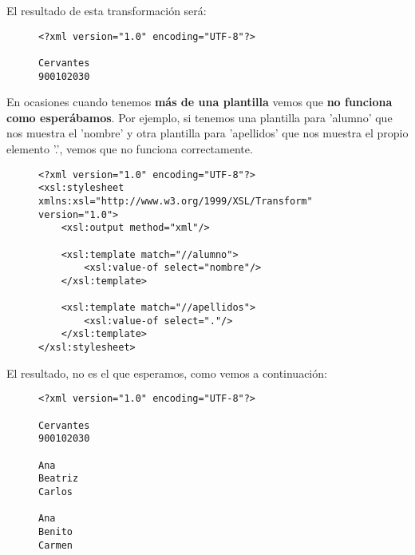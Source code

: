 El resultado de esta transformación será:

\begin{figure}[H]
    \begin{tcolorbox}[sharp corners, colback=yellow!30, colframe=white!20]
        \scriptsize
\begin{verbatim}
<?xml version="1.0" encoding="UTF-8"?>

Cervantes
900102030
\end{verbatim}
    \end{tcolorbox}
\end{figure}

En ocasiones cuando tenemos \textbf{más de una plantilla} vemos que \textbf{no funciona como esperábamos}. Por ejemplo, si tenemos una plantilla para 'alumno' que nos muestra el 'nombre' y otra plantilla para 'apellidos' que nos muestra el propio elemento '.', vemos que no funciona correctamente.

\begin{figure}[H]
    \begin{tcolorbox}[sharp corners, colback=yellow!30, colframe=white!20]
        \scriptsize
\begin{verbatim}
<?xml version="1.0" encoding="UTF-8"?>
<xsl:stylesheet xmlns:xsl="http://www.w3.org/1999/XSL/Transform" version="1.0">
    <xsl:output method="xml"/>

    <xsl:template match="//alumno">
        <xsl:value-of select="nombre"/>
    </xsl:template>

    <xsl:template match="//apellidos">
        <xsl:value-of select="."/>
    </xsl:template>
</xsl:stylesheet>
\end{verbatim}
    \end{tcolorbox}
\end{figure}

El resultado, no es el que esperamos, como vemos a continuación:

\begin{figure}[H]
    \begin{tcolorbox}[sharp corners, colback=yellow!30, colframe=white!20]
        \scriptsize
\begin{verbatim}
<?xml version="1.0" encoding="UTF-8"?>

Cervantes
900102030

Ana
Beatriz
Carlos

Ana
Benito
Carmen
\end{verbatim}
    \end{tcolorbox}
\end{figure}

